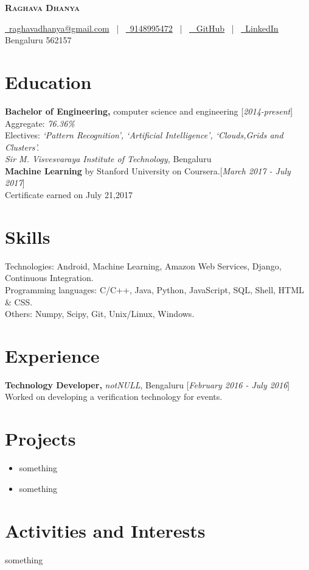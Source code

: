 \documentclass[10pt]{article}
\begin{document}
\thispagestyle{empty}

\begin{center}
\textbf{\textsc{\Huge Raghava Dhanya}}
\end{center}
\begin{center}
\href{mailto:raghavadhanya@gmail.com}{\faEnvelope\ raghavadhanya@gmail.com}
\ | \
\href{tel:9148995472}{\faPhoneSquare\ 9148995472}
\ | \
\href{https://github.com/RaghavaDhanya}{ \underline{\faGithubSquare\ GitHub}}
\ | \ 
\href{https://in.linkedin.com/in/raghavadhanya}{\underline{\faLinkedinSquare\ LinkedIn}}
\\
Bengaluru 562157
\end{center}

\section{Education}
\textbf{Bachelor of Engineering,} computer science and engineering \hfill [\textit{2014-present}]\\
Aggregate: \textit{76.36\%}\\
Electives: \textit{`Pattern Recognition', `Artificial Intelligence', `Clouds,Grids and Clusters'.}\\
\textit{Sir M. Visvesvaraya Institute of Technology,} Bengaluru
\\[10pt]
\textbf{Machine Learning} by Stanford University on Coursera.\hfill [\textit{March 2017 - July 2017}]\\
Certificate earned on July 21,2017 
\section{Skills}
Technologies: Android, Machine Learning, Amazon Web Services, Django, Continuous Integration.\\
Programming languages: C/C++, Java, Python, JavaScript, SQL, Shell, HTML \& CSS.\\
Others: Numpy, Scipy, Git, Unix/Linux, Windows.
\section{Experience}
\textbf{Technology Developer,} \textit{notNULL}, Bengaluru \hfill [\textit{February 2016 - July 2016}]\\
Worked on developing a verification technology for events. 
\section{Projects}
\begin{itemize}
	\item something
	\item something
\end{itemize}
\section{Activities and Interests}
something
\end{document}
